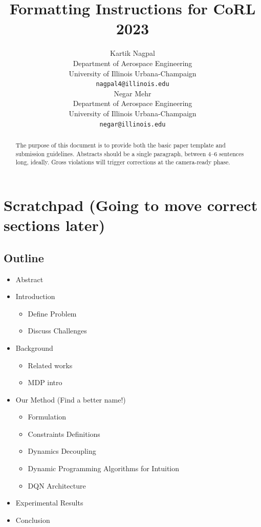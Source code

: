 \documentclass{article}
\title{Formatting Instructions for CoRL 2023}
\author{
  Kartik Nagpal\\
  Department of Aerospace Engineering\\
  University of Illinois Urbana-Champaign\\
  \texttt{nagpal4@illinois.edu} \\
  \And
  Negar Mehr \\
  Department of Aerospace Engineering\\
  University of Illinois Urbana-Champaign\\
  \texttt{negar@illinois.edu} \\
}
\begin{document}
\maketitle


\begin{abstract}
    The purpose of this document is to provide both the basic paper template and submission guidelines. Abstracts should be a single paragraph, between 4--6 sentences long, ideally. Gross violations will trigger corrections at the camera-ready phase.
\end{abstract}



\section{Scratchpad {\color{red} (Going to move correct sections later)}}

\subsection{Outline}
\begin{itemize}
 \item Abstract
 \item Introduction
 \begin{itemize}
     \item Define Problem
     \item Discuss Challenges
 \end{itemize}
 \item Background
 \begin{itemize}
    \item Related works
    \item MDP intro
 \end{itemize}
 \item Our Method (Find a better name!)
 \begin{itemize}
     \item Formulation
     \item Constraints Definitions
     \item Dynamics Decoupling
     \item Dynamic Programming Algorithms for Intuition
     \item DQN Architecture
 \end{itemize}
 \item Experimental Results
 \item Conclusion
\end{itemize}
\end{document}
